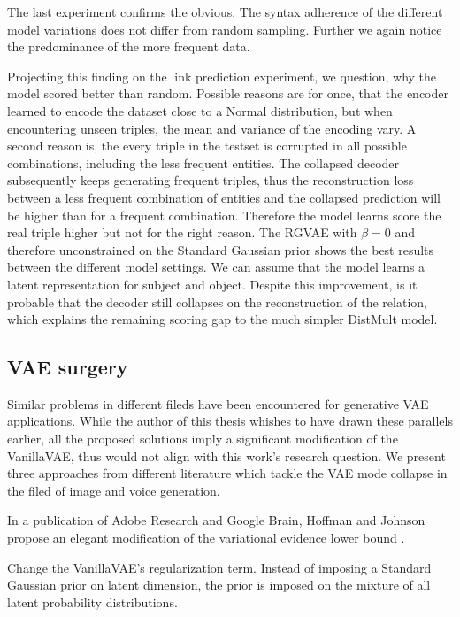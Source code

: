 The last experiment confirms the obvious. The syntax adherence of the different model variations does not differ from random sampling. Further we again notice the predominance of the more frequent data.


Projecting this finding on the link prediction experiment, we question, why the model scored better than random. Possible reasons are for once, that the encoder learned to encode the dataset close to a Normal distribution, but when encountering unseen triples, the mean and variance of the encoding vary. A second reason is, the every triple in the testset is corrupted in all possible combinations, including the less frequent entities. The collapsed decoder subsequently keeps generating frequent triples, thus the reconstruction loss between a less frequent combination of entities and the collapsed prediction will be higher than for a frequent combination. Therefore the model learns score the real triple higher but not for the right reason. The RGVAE with $\beta = 0$ and therefore unconstrained on the Standard Gaussian prior shows the best results between the different model settings. We can assume that the model learns a latent representation for subject and object. Despite this improvement, is it probable that the decoder still collapses on the reconstruction of the relation, which explains the remaining scoring gap to the much simpler DistMult model.


\subsection{VAE surgery}
\label{ssec7:solutions}

Similar problems in different fileds have been encountered for generative VAE applications. While the author of this thesis whishes to have drawn these parallels earlier, all the proposed solutions imply a significant modification of the VanillaVAE, thus would not align with this work's research question. We present three approaches from different literature which tackle the VAE mode collapse in the filed of image and voice generation.

In a publication of Adobe Research and Google Brain, Hoffman and Johnson propose an elegant modification of the variational evidence lower bound \cite{hoffman2016elbo}. 

Change the VanillaVAE's regularization term. Instead of imposing a Standard Gaussian prior on latent dimension, the prior is imposed on the mixture of all latent probability distributions. 

